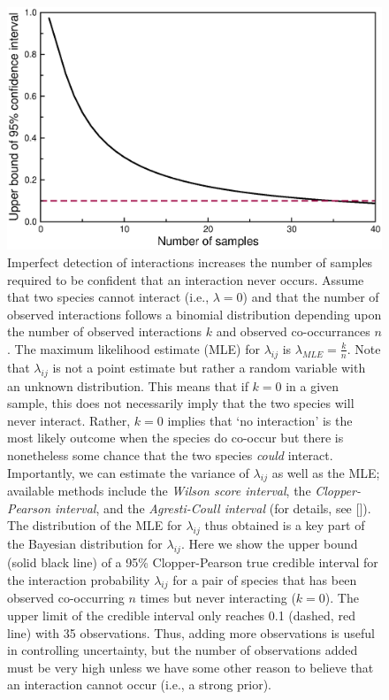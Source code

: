 \documentclass[12pt]{article}
\begin{document}
        \begin{figure}[h!]
          \caption{Imperfect detection of interactions increases the number of samples required to be confident that an interaction never occurs. Assume that two species cannot interact (i.e., $\lambda=0$) and that the number of observed interactions follows a binomial distribution depending upon the number of observed interactions $k$ and observed co-occurrances $n$. The maximum likelihood estimate (MLE) for $\lambda_{ij}$ is $\lambda_{MLE}=\frac{k}{n}$. Note that $\lambda_{ij}$ is not a point estimate but rather a random variable with an unknown distribution. This means that if $k = 0$ in a given sample, this does not necessarily imply that the two species will never interact. Rather, $k = 0$ implies that `no interaction' is the most likely outcome when the species do co-occur but there is nonetheless some chance that the two species \emph{could} interact.\\
          Importantly, we can estimate the variance of $\lambda_{ij}$ as well as the MLE; available methods include the \emph{Wilson score interval}, the \emph{Clopper-Pearson interval}, and the \emph{Agresti-Coull interval} (for details, see [\citealp{Brown2001}]). The distribution of the MLE for $\lambda_{ij}$ thus obtained is a key part of the Bayesian distribution for $\lambda_{ij}$.
          Here we show the upper bound (solid black line) of a 95\% Clopper-Pearson true credible interval for the interaction probability $\lambda_{ij}$ for a pair of species that has been observed co-occurring $n$ times but never interacting ($k = 0$). The upper limit of the credible interval only reaches 0.1 (dashed, red line) with 35 observations. Thus, adding more observations is useful in controlling uncertainty, but the number of observations added must be very high unless we have some other reason to believe that an interaction cannot occur (i.e., a strong prior).}
          \label{upper_limits}
          \begin{center}
          \includegraphics*[width=.8\textwidth]{figures/upper_limit_DG.eps}
          \end{center}
          \end{figure}
\end{document}
